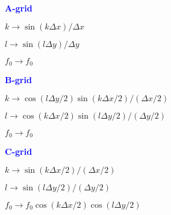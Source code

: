 \documentclass[a4]{seminar}
\newcommand{\B}[1]{\textcolor{blue}{#1}}
\begin{document}
\begin{slide}

\B{\bf A-grid}

\begin{minipage}{47mm}
\end{minipage}
\begin{minipage}{60mm}
\( k \rightarrow \sin (k \Delta x) / \Delta x \)

\( l \rightarrow \sin (l \Delta y) / \Delta y \)

\( f_0 \rightarrow f_0 \)
\end{minipage}

\begin{center}
\end{center}

\end{slide}


\begin{slide}

\B{\bf B-grid}

\begin{minipage}{47mm}
\end{minipage}
\begin{minipage}{60mm}
\( k \rightarrow \cos(l \Delta y / 2) \sin (k \Delta x / 2) / ( \Delta x / 2 )\)

\( l \rightarrow \cos(k \Delta x / 2) \sin (l \Delta y / 2) / ( \Delta y / 2 )\)

\( f_0 \rightarrow f_0 \)
\end{minipage}


\begin{center}
\end{center}

\end{slide}


\begin{slide}

\B{\bf C-grid}

\begin{minipage}{47mm}
\end{minipage}
\begin{minipage}{60mm}
\( k \rightarrow \sin (k \Delta x / 2) / ( \Delta x / 2 )\)

\( l \rightarrow \sin (l \Delta y / 2) / ( \Delta y / 2 )\)

\( f_0 \rightarrow f_0 \cos(k \Delta x / 2) \cos(l \Delta y / 2)\)
\end{minipage}


\begin{center}
\end{center}

\end{slide}
\end{document}
